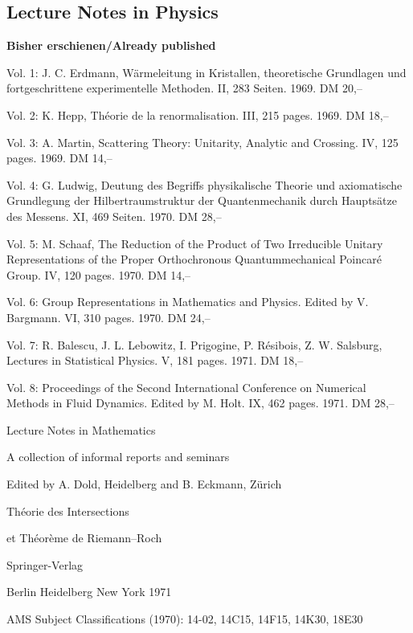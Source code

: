 \subsection*{Lecture Notes in Physics}
\textbf{Bisher erschienen/Already published}

Vol. 1: J. C. Erdmann, Wärmeleitung in Kristallen, theoretische Grundlagen und
fortgeschrittene experimentelle Methoden. II, 283 Seiten. 1969. DM 20,--

Vol. 2: K. Hepp, Théorie de la renormalisation. III, 215 pages. 1969. DM 18,--

Vol. 3: A. Martin, Scattering Theory: Unitarity, Analytic and Crossing.
IV, 125 pages. 1969. DM 14,--

Vol. 4: G. Ludwig, Deutung des Begriffs physikalische Theorie und axiomatische
Grundlegung der Hilbertraumstruktur der Quantenmechanik durch Hauptsätze des
Messens. XI, 469 Seiten. 1970. DM 28,--

Vol. 5: M. Schaaf, The Reduction of the Product of Two Irreducible Unitary
Representations of the Proper Orthochronous Quantummechanical Poincaré Group.
IV, 120 pages. 1970. DM 14,--

Vol. 6: Group Representations in Mathematics and Physics. Edited by V. Bargmann.
VI, 310 pages. 1970. DM 24,--

Vol. 7: R. Balescu, J. L. Lebowitz, I. Prigogine, P. Résibois, Z. W. Salsburg,
Lectures in Statistical Physics. V, 181 pages. 1971. DM 18,--

Vol. 8: Proceedings of the Second International Conference on Numerical Methods
in Fluid Dynamics. Edited by M. Holt. IX, 462 pages. 1971. DM 28,--

\begin{center}
{\Large Lecture Notes in Mathematics}\par
A collection of informal reports and seminars\par
Edited by A. Dold, Heidelberg and B. Eckmann, Zürich\par
{}\par
\bigskip
{\Large Théorie des Intersections\par
et Théorème de Riemann--Roch}\par
\bigskip
Springer-Verlag\par
Berlin \textperiodcentered{} Heidelberg \textperiodcentered{} New York 1971
\end{center}

AMS Subject Classifications (1970): 14-02, 14C15, 14F15, 14K30, 18E30

